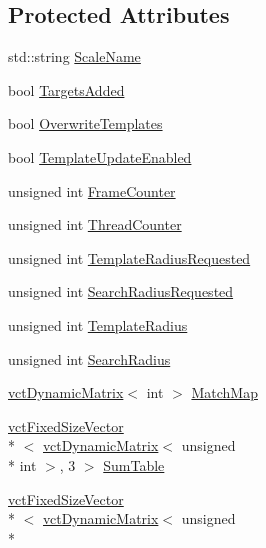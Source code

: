 \subsection*{Protected Attributes}
\begin{DoxyCompactItemize}
\item 
std\-::string \hyperlink{classsvl_tracker_m_s_brute_force_a1e48647fd161e3c9dd6fff65b3c5243d}{Scale\-Name}
\item 
bool \hyperlink{classsvl_tracker_m_s_brute_force_afc769fd867e5fd511d8e866d6afc0cef}{Targets\-Added}
\item 
bool \hyperlink{classsvl_tracker_m_s_brute_force_ac7a340867937fb943fdfec8761fe5271}{Overwrite\-Templates}
\item 
bool \hyperlink{classsvl_tracker_m_s_brute_force_a91ed76d3ee8a263cfb9505458105d15f}{Template\-Update\-Enabled}
\item 
unsigned int \hyperlink{classsvl_tracker_m_s_brute_force_aadd564cde91b04c46b59a9040a581f7b}{Frame\-Counter}
\item 
unsigned int \hyperlink{classsvl_tracker_m_s_brute_force_ac89d9f21981711ec7c4b08e57f66ef99}{Thread\-Counter}
\item 
unsigned int \hyperlink{classsvl_tracker_m_s_brute_force_aee46bfec573c07156546b96268d1260b}{Template\-Radius\-Requested}
\item 
unsigned int \hyperlink{classsvl_tracker_m_s_brute_force_a50aa9929292526c7e8befbd0cd3e0a1b}{Search\-Radius\-Requested}
\item 
unsigned int \hyperlink{classsvl_tracker_m_s_brute_force_a1d8d977d818d959b48a246d90f46078f}{Template\-Radius}
\item 
unsigned int \hyperlink{classsvl_tracker_m_s_brute_force_a85f55059dc58f50521118f18b27ab5be}{Search\-Radius}
\item 
\hyperlink{classvct_dynamic_matrix}{vct\-Dynamic\-Matrix}$<$ int $>$ \hyperlink{classsvl_tracker_m_s_brute_force_a75103ffe8ce2320d23c2b67e5179ddcd}{Match\-Map}
\item 
\hyperlink{classvct_fixed_size_vector}{vct\-Fixed\-Size\-Vector}\\*
$<$ \hyperlink{classvct_dynamic_matrix}{vct\-Dynamic\-Matrix}$<$ unsigned \\*
int $>$, 3 $>$ \hyperlink{classsvl_tracker_m_s_brute_force_a31316d5309eb29726f47be49a2342def}{Sum\-Table}
\item 
\hyperlink{classvct_fixed_size_vector}{vct\-Fixed\-Size\-Vector}\\*
$<$ \hyperlink{classvct_dynamic_matrix}{vct\-Dynamic\-Matrix}$<$ unsigned \\*

\end{DoxyCompactItemize}
